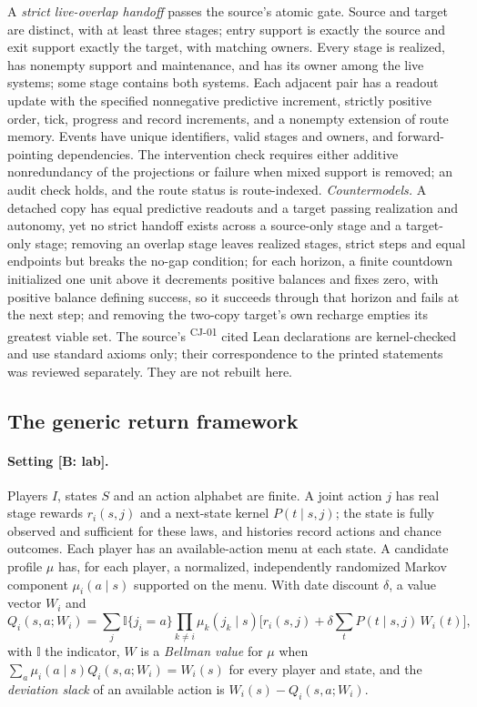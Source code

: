\documentclass[pdflatex,sn-basic]{sn-jnl}%
\newcommand{\slot}[1]{}%
\newcommand{\rec}[1]{\ifannotated\textsuperscript{\textcolor{blue!60!black}{\tiny#1}}\fi}
\begin{document}
\begin{appendices}
A \emph{strict live-overlap handoff} passes the source's atomic gate. Source and target are distinct, with at least three stages; entry support is exactly the source and exit support exactly the target, with matching owners. Every stage is realized, has nonempty support and maintenance, and has its owner among the live systems; some stage contains both systems. Each adjacent pair has a readout update with the specified nonnegative predictive increment, strictly positive order, tick, progress and record increments, and a nonempty extension of route memory. Events have unique identifiers, valid stages and owners, and forward-pointing dependencies. The intervention check requires either additive nonredundancy of the projections or failure when mixed support is removed; an audit check holds, and the route status is route-indexed. \emph{Countermodels.} A detached copy has equal predictive readouts and a target passing realization and autonomy, yet no strict handoff exists across a source-only stage and a target-only stage; removing an overlap stage leaves realized stages, strict steps and equal endpoints but breaks the no-gap condition; for each horizon, a finite countdown initialized one unit above it decrements positive balances and fixes zero, with positive balance defining success, so it succeeds through that horizon and fails at the next step; and removing the two-copy target's own recharge empties its greatest viable set. The source's \numTTPCitedDecls\rec{CJ-01} cited Lean declarations are kernel-checked and use standard axioms only; their correspondence to the printed statements was reviewed separately. They are not rebuilt here.
\subsection{The generic return framework}\label{app:return}

\slot{A.6}
\paragraph{Setting [B: lab].} Players $I$, states $S$ and an action alphabet are finite. A joint action $j$ has real stage rewards $r_i(s,j)$ and a next-state kernel $P(t\mid s,j)$; the state is fully observed and sufficient for these laws, and histories record actions and chance outcomes. Each player has an available-action menu at each state. A candidate profile $\mu$ has, for each player, a normalized, independently randomized Markov component $\mu_i(a\mid s)$ supported on the menu. With date discount $\delta$, a value vector $W_i$ and
\[
Q_i(s,a;W_i)=\sum_j \mathbb I\{j_i=a\}\prod_{k\neq i}\mu_k(j_k\mid s)\Big[r_i(s,j)+\delta\sum_t P(t\mid s,j)\,W_i(t)\Big],
\]
with $\mathbb I$ the indicator, $W$ is a \emph{Bellman value} for $\mu$ when $\sum_a\mu_i(a\mid s)Q_i(s,a;W_i)=W_i(s)$ for every player and state, and the \emph{deviation slack} of an available action is $W_i(s)-Q_i(s,a;W_i)$.


\end{appendices}
\end{document}
